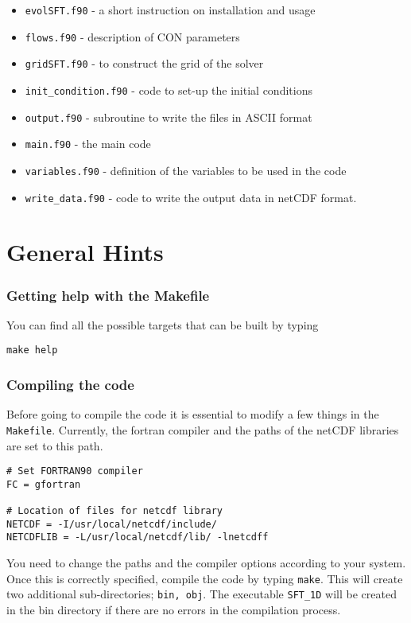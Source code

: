 \begin{itemize}\itemsep=0pt
\item {\tt evolSFT.f90} - a short instruction on installation and usage
\item {\tt flows.f90} - description of CON parameters
\item {\tt grid\-SFT.f90} - to construct the grid of the solver
\item {\tt init\_condition.f90} - code to set-up the initial conditions
\item {\tt output.f90} - subroutine to write the files in ASCII format
\item {\tt main.f90} - the main code
\item {\tt variables.f90} - definition of the variables to be used in the code
\item {\tt write\_data.f90} - code to write the output data in netCDF format.
\end{itemize}

\section{General Hints}

\subsubsection{Getting help with the Makefile}

You can find all the possible
targets  that can be built by typing
\begin{verbatim}
make help
\end{verbatim}

\subsubsection{Compiling the code}
Before going to compile the code it is essential to modify a few things in the \texttt{Makefile}.
Currently, the fortran compiler and the paths of the netCDF libraries are set to this path.
\begin{verbatim}
# Set FORTRAN90 compiler
FC = gfortran

# Location of files for netcdf library
NETCDF = -I/usr/local/netcdf/include/
NETCDFLIB = -L/usr/local/netcdf/lib/ -lnetcdff
\end{verbatim}
You need to change the paths and the compiler options according to your system. Once this is correctly specified, compile the code by typing \texttt{make}. This will create two additional sub-directories; \texttt{bin, obj}. The executable \texttt{SFT\_1D} will be created in the bin directory if there are no errors in the compilation process.

